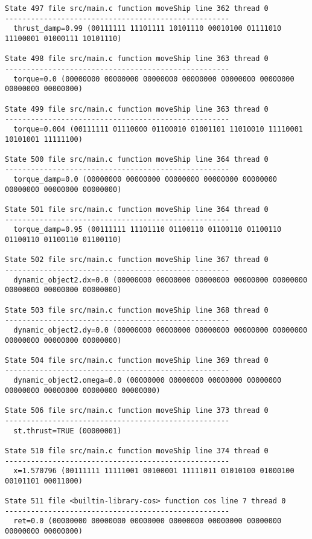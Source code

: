 \begin{verbatim}
State 497 file src/main.c function moveShip line 362 thread 0
----------------------------------------------------
  thrust_damp=0.99 (00111111 11101111 10101110 00010100 01111010 11100001 01000111 10101110)

State 498 file src/main.c function moveShip line 363 thread 0
----------------------------------------------------
  torque=0.0 (00000000 00000000 00000000 00000000 00000000 00000000 00000000 00000000)

State 499 file src/main.c function moveShip line 363 thread 0
----------------------------------------------------
  torque=0.004 (00111111 01110000 01100010 01001101 11010010 11110001 10101001 11111100)

State 500 file src/main.c function moveShip line 364 thread 0
----------------------------------------------------
  torque_damp=0.0 (00000000 00000000 00000000 00000000 00000000 00000000 00000000 00000000)

State 501 file src/main.c function moveShip line 364 thread 0
----------------------------------------------------
  torque_damp=0.95 (00111111 11101110 01100110 01100110 01100110 01100110 01100110 01100110)

State 502 file src/main.c function moveShip line 367 thread 0
----------------------------------------------------
  dynamic_object2.dx=0.0 (00000000 00000000 00000000 00000000 00000000 00000000 00000000 00000000)

State 503 file src/main.c function moveShip line 368 thread 0
----------------------------------------------------
  dynamic_object2.dy=0.0 (00000000 00000000 00000000 00000000 00000000 00000000 00000000 00000000)

State 504 file src/main.c function moveShip line 369 thread 0
----------------------------------------------------
  dynamic_object2.omega=0.0 (00000000 00000000 00000000 00000000 00000000 00000000 00000000 00000000)

State 506 file src/main.c function moveShip line 373 thread 0
----------------------------------------------------
  st.thrust=TRUE (00000001)

State 510 file src/main.c function moveShip line 374 thread 0
----------------------------------------------------
  x=1.570796 (00111111 11111001 00100001 11111011 01010100 01000100 00101101 00011000)

State 511 file <builtin-library-cos> function cos line 7 thread 0
----------------------------------------------------
  ret=0.0 (00000000 00000000 00000000 00000000 00000000 00000000 00000000 00000000)


\end{verbatim}
